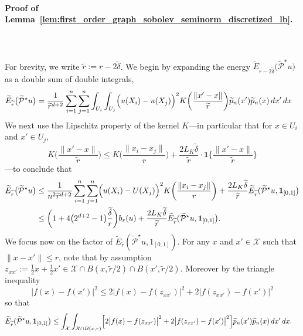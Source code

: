 \documentclass{article}
\newcommand{\1}{\mathbf{1}}
\newcommand{\Xset}{\mathcal{X}}
\newcommand{\mc}[1]{\mathcal{#1}}
\newcommand{\wt}[1]{\widetilde{#1}}
\theoremstyle{alden}
\theoremstyle{aldenthm}
\theoremstyle{definition}
\theoremstyle{remark}
\begin{document}
\paragraph{Proof of Lemma~\ref{lem:first_order_graph_sobolev_seminorm_discretized_lb}.}
\mbox{} \\
\mbox{} \\
For brevity, we write $\wt{r} := r - 2\wt{\delta}$. We begin by expanding the energy $\wt{E}_{r - 2\wt{\delta}}\bigl(\wt{\mc{P}}^{\star}u\bigr)$ as a double sum of double integrals,
\begin{align*}
\wt{E}_{\wt{r}}\bigl(\wt{\mc{P}}^{\star}u\bigr) & = \frac{1}{\wt{r}^{d + 2}} \sum_{i = 1}^{n} \sum_{j = 1}^{n} \int_{U_i} \int_{U_j} \Bigl(u(X_i) - u(X_j)\Bigr)^2 K\biggl(\frac{\|x' - x\|}{\wt{r}}\biggr) \wt{p}_n(x') \wt{p}_n(x) \,dx' \,dx
\end{align*}
We next use the Lipschitz property of the kernel $K$---in particular that for $x \in U_i$ and $x' \in U_j$,
\begin{equation*}
K\biggl(\frac{\|x' - x\|}{\wt{r}}\biggr) \leq K\biggl(\frac{\|x_i - x_j\|}{r}\biggr) + \frac{2L_K\wt{\delta}}{\wt{r}} \cdot \1\biggl\{\frac{\|x' - x\|}{\wt{r}}\biggr\}
\end{equation*}
---to conclude that
\begin{align}
\wt{E}_{\wt{r}}\bigl(\wt{\mc{P}}^{\star}u\bigr) & \leq \frac{1}{n^2\wt{r}^{d + 2}} \sum_{i = 1}^{n} \sum_{j = 1}^{n} \Bigl(u(X_i) - U(X_j)\Bigr)^2 K\biggl(\frac{\|x_i - x_j\|}{r}\biggr) + \frac{2L_K\wt{\delta}}{\wt{r}}\wt{E}_{\wt{r}}(\wt{\mc{P}}^{\star}u,\1_{[0,1]}\bigr) \nonumber \\
& \leq \biggl(1 + 4\bigl(2^{d + 2} - 1\bigr)\frac{\wt{\delta}}{r}\biggr) b_r(u) + \frac{2L_K\wt{\delta}}{\wt{r}}\wt{E}_{\wt{r}}(\wt{\mc{P}}^{\star}u,\1_{[0,1]}\bigr) \label{pf:lem_first_order_graph_sobolev_seminorm_discretized_1}.
\end{align}
We focus now on the factor of $\wt{E}_{\wt{r}}(\wt{\mc{P}}^{\star}u,1_{[0,1]})$. For any $x$ and $x' \in \Xset$ such that $\|x - x'\| \leq r$, note that by assumption $z_{xx'}:= \frac{1}{2}x + \frac{1}{2}x' \in \Xset \cap B(x,\wt{r}/2) \cap B(x',\wt{r}/2)$. Moreover by the triangle inequality
\begin{equation*}
\bigl|f(x) - f(x')\bigr|^2 \leq 2\bigl|f(x) - f(z_{xx'})\bigr|^2 + 2\bigl|f(z_{xx'}) - f(x')\bigr|^2
\end{equation*}
so that
\begin{align*}
\wt{E}_{\wt{r}}(\wt{\mc{P}}^{\star}u,\1_{[0,1]}\bigr) & \leq \int_{\Xset} \int_{\Xset \cap B(x,r)} \Bigl[ 2\bigl|f(x) - f(z_{xx'})\bigr|^2 +  2\bigl|f(z_{xx'}) - f(x')\bigr|^2\Bigr] \wt{p}_n(x') \wt{p}_n(x) \,dx' \,dx.
\end{align*}
\end{document}

